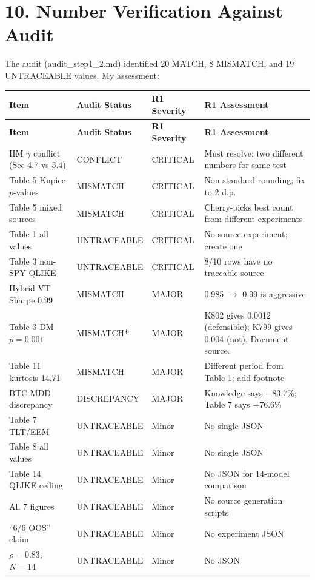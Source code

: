 \documentclass[12pt,a4paper]{article}
\begin{document}
\bigskip

\section*{10. Number Verification Against Audit}

The audit (audit\_step1\_2.md) identified 20 MATCH, 8 MISMATCH, and 19 UNTRACEABLE values. My assessment:

\begin{longtable}{p{4cm}p{3cm}p{2cm}p{5cm}}
\toprule
\textbf{Item} & \textbf{Audit Status} & \textbf{R1 Severity} & \textbf{R1 Assessment} \\
\midrule
\endfirsthead
\toprule
\textbf{Item} & \textbf{Audit Status} & \textbf{R1 Severity} & \textbf{R1 Assessment} \\
\midrule
\endhead
HM $\gamma$ conflict (Sec 4.7 vs 5.4) & CONFLICT & \textcolor{errorred}{CRITICAL} & Must resolve; two different numbers for same test \\
Table 5 Kupiec $p$-values & MISMATCH & \textcolor{errorred}{CRITICAL} & Non-standard rounding; fix to 2 d.p. \\
Table 5 mixed sources & MISMATCH & \textcolor{errorred}{CRITICAL} & Cherry-picks best count from different experiments \\
Table 1 all values & UNTRACEABLE & \textcolor{errorred}{CRITICAL} & No source experiment; create one \\
Table 3 non-SPY QLIKE & UNTRACEABLE & \textcolor{errorred}{CRITICAL} & 8/10 rows have no traceable source \\
Hybrid VT Sharpe 0.99 & MISMATCH & \textcolor{warncolor}{MAJOR} & 0.985 $\to$ 0.99 is aggressive \\
Table 3 DM $p = 0.001$ & MISMATCH* & \textcolor{warncolor}{MAJOR} & K802 gives 0.0012 (defensible); K799 gives 0.004 (not). Document source. \\
Table 11 kurtosis 14.71 & MISMATCH & \textcolor{warncolor}{MAJOR} & Different period from Table 1; add footnote \\
BTC MDD discrepancy & DISCREPANCY & \textcolor{warncolor}{MAJOR} & Knowledge says $-83.7\%$; Table 7 says $-76.6\%$ \\
Table 7 TLT/EEM & UNTRACEABLE & Minor & No single JSON \\
Table 8 all values & UNTRACEABLE & Minor & No single JSON \\
Table 14 QLIKE ceiling & UNTRACEABLE & Minor & No JSON for 14-model comparison \\
All 7 figures & UNTRACEABLE & Minor & No source generation scripts \\
``6/6 OOS'' claim & UNTRACEABLE & Minor & No experiment JSON \\
$\rho = 0.83$, $N = 14$ & UNTRACEABLE & Minor & No JSON \\
\bottomrule
\end{longtable}
\end{document}
